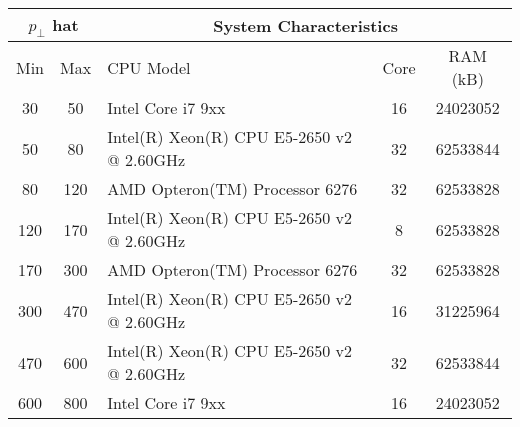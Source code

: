 \begin{table}[htp]
\centering

\begin{tabular}{|c|c|l|c|c|}
\hline
\multicolumn{2}{|c|}{$p_\perp$ hat} & \multicolumn{3}{c|}{System Characteristics} \\
\hline
Min & Max & CPU Model & Core & RAM (kB) \\
\hline
\hline
 30 &  50 & Intel Core i7 9xx                         & 16 & 24023052 \\
 50 &  80 & Intel(R) Xeon(R) CPU E5-2650 v2 @ 2.60GHz & 32 & 62533844 \\
 80 & 120 & AMD Opteron(TM) Processor 6276            & 32 & 62533828 \\
120 & 170 & Intel(R) Xeon(R) CPU E5-2650 v2 @ 2.60GHz &  8 & 62533828 \\
170 & 300 & AMD Opteron(TM) Processor 6276            & 32 & 62533828 \\
300 & 470 & Intel(R) Xeon(R) CPU E5-2650 v2 @ 2.60GHz & 16 & 31225964 \\
470 & 600 & Intel(R) Xeon(R) CPU E5-2650 v2 @ 2.60GHz & 32 & 62533844 \\
600 & 800 & Intel Core i7 9xx                         & 16 & 24023052 \\
\hline	
\end{tabular}

\label{table_QCD_ProdUnfiltered_Hardware}
\end{table}
